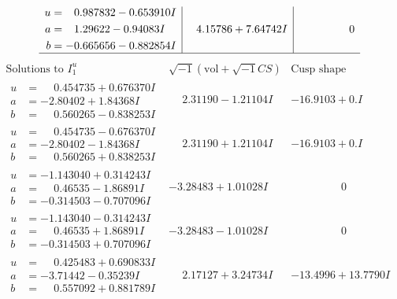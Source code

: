 \documentclass[1p]{elsarticle_modified}
\theoremstyle{definition}
\newcommand{\I}{\sqrt{-1}}
\begin{document}
$$\begin{array}{c|c|c}
\begin{aligned}
u &= \phantom{-}0.987832 - 0.653910 I \\
a &= \phantom{-}1.29622 - 0.94083 I \\
b &= -0.665656 - 0.882854 I\end{aligned}
 & \phantom{-}4.15786 + 7.64742 I & \phantom{-0.000000 } 0\\
 \hline 
 \end{array}$$\newpage$$\begin{array}{c|c|c}  
\text{Solutions to }I^u_{1}& \I (\text{vol} + \sqrt{-1}CS) & \text{Cusp shape}\\
 \hline 
\begin{aligned}
u &= \phantom{-}0.454735 + 0.676370 I \\
a &= -2.80402 + 1.84368 I \\
b &= \phantom{-}0.560265 - 0.838253 I\end{aligned}
 & \phantom{-}2.31190 - 1.21104 I & -16.9103 + 0. I\phantom{ +0.000000I} \\ \hline\begin{aligned}
u &= \phantom{-}0.454735 - 0.676370 I \\
a &= -2.80402 - 1.84368 I \\
b &= \phantom{-}0.560265 + 0.838253 I\end{aligned}
 & \phantom{-}2.31190 + 1.21104 I & -16.9103 + 0. I\phantom{ +0.000000I} \\ \hline\begin{aligned}
u &= -1.143040 + 0.314243 I \\
a &= \phantom{-}0.46535 - 1.86891 I \\
b &= -0.314503 - 0.707096 I\end{aligned}
 & -3.28483 + 1.01028 I & \phantom{-0.000000 } 0 \\ \hline\begin{aligned}
u &= -1.143040 - 0.314243 I \\
a &= \phantom{-}0.46535 + 1.86891 I \\
b &= -0.314503 + 0.707096 I\end{aligned}
 & -3.28483 - 1.01028 I & \phantom{-0.000000 } 0 \\ \hline\begin{aligned}
u &= \phantom{-}0.425483 + 0.690833 I \\
a &= -3.71442 - 0.35239 I \\
b &= \phantom{-}0.557092 + 0.881789 I\end{aligned}
 & \phantom{-}2.17127 + 3.24734 I & -13.4996 + 13.7790 I \\ \hline\begin{aligned}

\end{aligned}
\end{array}$$
\end{document}
